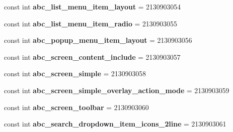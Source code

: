 \begin{DoxyCompactItemize}
\item 
\hypertarget{classClient_1_1Droid_1_1Resource_1_1Layout_a444cd3c390986dc3b4f1eb7f3e907458}{}const int {\bfseries abc\+\_\+list\+\_\+menu\+\_\+item\+\_\+layout} = 2130903054\label{classClient_1_1Droid_1_1Resource_1_1Layout_a444cd3c390986dc3b4f1eb7f3e907458}

\item 
\hypertarget{classClient_1_1Droid_1_1Resource_1_1Layout_aee03a35e9c370e50f62d36dc1c42f9aa}{}const int {\bfseries abc\+\_\+list\+\_\+menu\+\_\+item\+\_\+radio} = 2130903055\label{classClient_1_1Droid_1_1Resource_1_1Layout_aee03a35e9c370e50f62d36dc1c42f9aa}

\item 
\hypertarget{classClient_1_1Droid_1_1Resource_1_1Layout_ab7ff2e3423cfbb60decdc0b1aac1a510}{}const int {\bfseries abc\+\_\+popup\+\_\+menu\+\_\+item\+\_\+layout} = 2130903056\label{classClient_1_1Droid_1_1Resource_1_1Layout_ab7ff2e3423cfbb60decdc0b1aac1a510}

\item 
\hypertarget{classClient_1_1Droid_1_1Resource_1_1Layout_a8d8a90ed2219f9116a458f3f3a20b0fc}{}const int {\bfseries abc\+\_\+screen\+\_\+content\+\_\+include} = 2130903057\label{classClient_1_1Droid_1_1Resource_1_1Layout_a8d8a90ed2219f9116a458f3f3a20b0fc}

\item 
\hypertarget{classClient_1_1Droid_1_1Resource_1_1Layout_a73a6ed94fd7ab0e6bbd5f1de8afaf8e7}{}const int {\bfseries abc\+\_\+screen\+\_\+simple} = 2130903058\label{classClient_1_1Droid_1_1Resource_1_1Layout_a73a6ed94fd7ab0e6bbd5f1de8afaf8e7}

\item 
\hypertarget{classClient_1_1Droid_1_1Resource_1_1Layout_ad08e97c0bde5234811041d2ff9ed8a08}{}const int {\bfseries abc\+\_\+screen\+\_\+simple\+\_\+overlay\+\_\+action\+\_\+mode} = 2130903059\label{classClient_1_1Droid_1_1Resource_1_1Layout_ad08e97c0bde5234811041d2ff9ed8a08}

\item 
\hypertarget{classClient_1_1Droid_1_1Resource_1_1Layout_adde3019c8a649053d9dfe5e984388fd4}{}const int {\bfseries abc\+\_\+screen\+\_\+toolbar} = 2130903060\label{classClient_1_1Droid_1_1Resource_1_1Layout_adde3019c8a649053d9dfe5e984388fd4}

\item 
\hypertarget{classClient_1_1Droid_1_1Resource_1_1Layout_afb1dd11a77cb60ad372b5fb02964e8f1}{}const int {\bfseries abc\+\_\+search\+\_\+dropdown\+\_\+item\+\_\+icons\+\_\+2line} = 2130903061\label{classClient_1_1Droid_1_1Resource_1_1Layout_afb1dd11a77cb60ad372b5fb02964e8f1}


\end{DoxyCompactItemize}
